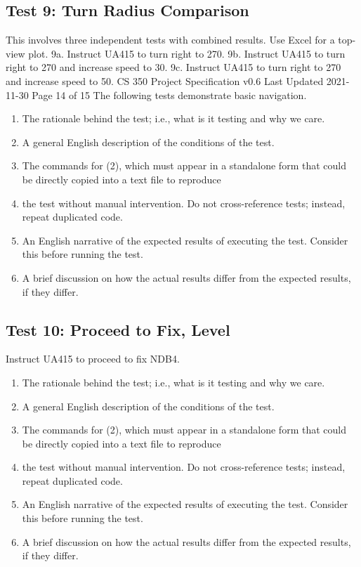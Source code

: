 \documentclass[letterpaper, 12pt]{article}
\begin{document}
\subsection{Test 9: Turn Radius Comparison}
This involves three independent tests with combined results. Use Excel for a top-view plot.
9a. Instruct UA415 to turn right to 270.
9b. Instruct UA415 to turn right to 270 and increase speed to 30.
9c. Instruct UA415 to turn right to 270 and increase speed to 50.
CS 350 Project Specification v0.6 Last Updated 2021-11-30 Page 14 of 15
The following tests demonstrate basic navigation.
\begin{enumerate}
\item The rationale behind the test; i.e., what is it testing and why we care.
\item A general English description of the conditions of the test.
\item The commands for (2), which must appear in a standalone form that could be directly copied into a text file to reproduce
\item the test without manual intervention. Do not cross-reference tests; instead, repeat duplicated code.
\item An English narrative of the expected results of executing the test. Consider this before running the test.
\item A brief discussion on how the actual results differ from the expected results, if they differ.
\end{enumerate}

\subsection{Test 10: Proceed to Fix, Level}
Instruct UA415 to proceed to fix NDB4.
\begin{enumerate}
\item The rationale behind the test; i.e., what is it testing and why we care.
\item A general English description of the conditions of the test.
\item The commands for (2), which must appear in a standalone form that could be directly copied into a text file to reproduce
\item the test without manual intervention. Do not cross-reference tests; instead, repeat duplicated code.
\item An English narrative of the expected results of executing the test. Consider this before running the test.
\item A brief discussion on how the actual results differ from the expected results, if they differ.
\end{enumerate}
\end{document}
